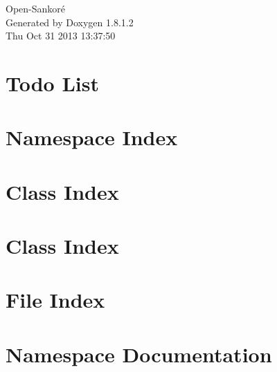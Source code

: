 \documentclass{book}
\begin{document}
\hypersetup{pageanchor=false,citecolor=blue}
\begin{titlepage}
\vspace*{7cm}
\begin{center}
{\Large Open-\/\-Sankoré }\\
\vspace*{1cm}
{\large Generated by Doxygen 1.8.1.2}\\
\vspace*{0.5cm}
{\small Thu Oct 31 2013 13:37:50}\\
\end{center}
\end{titlepage}
\clearemptydoublepage
{}
\tableofcontents
\clearemptydoublepage
{}
\hypersetup{pageanchor=true,citecolor=blue}
\chapter{Todo List}
\label{todo}
\hypertarget{todo}{}

\chapter{Namespace Index}

\chapter{Class Index}

\chapter{Class Index}

\chapter{File Index}

\chapter{Namespace Documentation}


\end{document}
